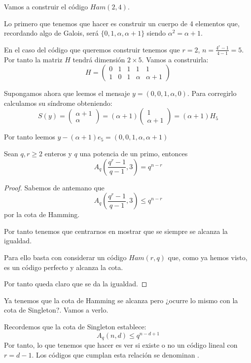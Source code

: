 \begin{example}
Vamos a construir el código $Ham(2,4)$.

Lo primero que tenemos que hacer es construir un cuerpo de 4 elementos que, recordando algo de Galois, será $\{0,1,α,α+1\}$ siendo $α^2=α+1$.

En el caso del código que queremos construir tenemos que $r=2$, $n=\frac{4^r-1}{4-1}=5$. Por tanto la matriz $H$ tendrá dimensión $2 \times 5$. Vamos a construirla:
\[H = \left(\begin{array}{ccccc}
0 & 1 & 1 & 1 & 1\\
1 & 0 & 1 & α & α+1
\end{array} \right)\]

Supongamos ahora que leemos el mensaje $y=(0,0,1,α,0)$. Para corregirlo calculamos su síndrome obteniendo:
\[S(y) =  \left(\begin{array}{c} α+1 \\ α\end{array} \right)=(α+1) \left(\begin{array}{c} 1 \\ α+1\end{array} \right) = (α+1) H_5\]

Por tanto leemos $y-(α+1)e_5 = (0,0,1,α,α+1)$
\end{example}

\begin{prop}
Sean $q,r \geq 2$ enteros y $q$ una potencia de un primo, entonces
\[A_q\left(\frac{q^r-1}{q-1},3\right) = q^{n-r}\]
\end{prop}

\begin{proof}
Sabemos de antemano que
\[A_q\left(\frac{q^r-1}{q-1},3\right) \leq q^{n-r}\]
por la cota de Hamming.

Por tanto tenemos que centrarnos en mostrar que se siempre se alcanza la igualdad.

Para ello basta con considerar un código $Ham(r,q)$ que, como ya hemos visto, es un código perfecto y alcanza la cota.

Por tanto queda claro que se da la igualdad.
\end{proof}

Ya tenemos que la cota de Hamming se alcanza pero ¿ocurre lo mismo con la cota de Singleton?. Vamos a verlo.

Recordemos que la cota de Singleton establece:
\[A_q(n,d) \leq q^{n-d+1}\]
Por tanto, lo que tenemos que hacer es ver si existe o no un código lineal con $r=d-1$. Los códigos que cumplan esta relación se denominan .

